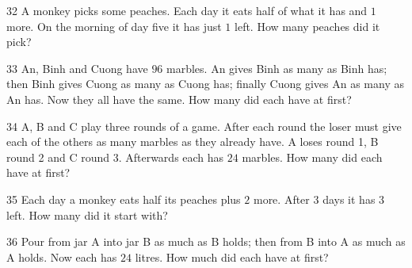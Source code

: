 \gap
\begin{probbox}{32}{}
A monkey picks some peaches. Each day it eats half of what it has and $1$ more. On the morning of day five it has just $1$ left. How many peaches did it pick?
\end{probbox}
\gap
\begin{probbox}{33}{}
An, Binh and Cuong have $96$ marbles. An gives Binh as many as Binh has; then Binh gives Cuong as many as Cuong has; finally Cuong gives An as many as An has. Now they all have the same. How many did each have at first?
\end{probbox}
\gap
\begin{probbox}{34}{}
A, B and C play three rounds of a game. After each round the loser must give each of the others as many marbles as they already have. A loses round 1, B round 2 and C round 3. Afterwards each has $24$ marbles. How many did each have at first?
\end{probbox}
\gap
\begin{probbox}{35}{}
Each day a monkey eats half its peaches plus $2$ more. After $3$ days it has $3$ left. How many did it start with?
\end{probbox}
\gap
\begin{probbox}{36}{}
Pour from jar A into jar B as much as B holds; then from B into A as much as A holds. Now each has $24$ litres. How much did each have at first?
\end{probbox}
